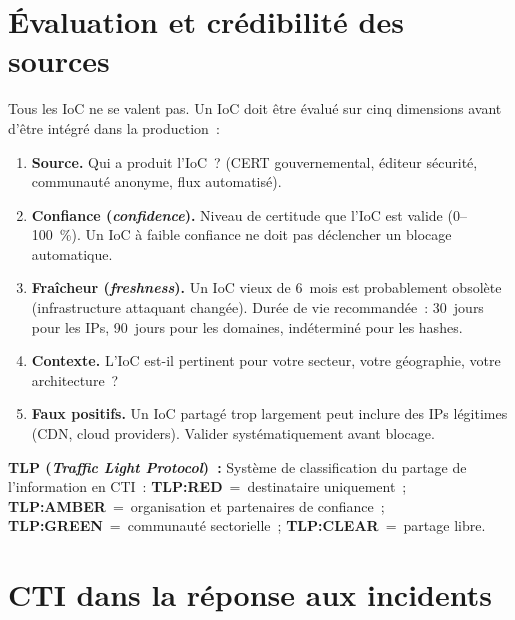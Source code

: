 \section{Évaluation et crédibilité des sources}
\label{sec:cti-credibilite}

Tous les IoC ne se valent pas. Un IoC doit être évalué sur cinq
dimensions avant d'être intégré dans la production~:

\begin{enumerate}
  \item \textbf{Source.} Qui a produit l'IoC~? (CERT gouvernemental,
        éditeur sécurité, communauté anonyme, flux automatisé).
  \item \textbf{Confiance (\textit{confidence}).} Niveau de certitude
        que l'IoC est valide (0--100~\%). Un IoC à faible confiance
        ne doit pas déclencher un blocage automatique.
  \item \textbf{Fraîcheur (\textit{freshness}).} Un IoC vieux de 6~mois
        est probablement obsolète (infrastructure attaquant changée).
        Durée de vie recommandée~: 30~jours pour les IPs,
        90~jours pour les domaines, indéterminé pour les hashes.
  \item \textbf{Contexte.} L'IoC est-il pertinent pour votre secteur,
        votre géographie, votre architecture~?
  \item \textbf{Faux positifs.} Un IoC partagé trop largement peut
        inclure des IPs légitimes (CDN, cloud providers). Valider
        systématiquement avant blocage.
\end{enumerate}

\begin{boxdef}
\textbf{TLP (\textit{Traffic Light Protocol})~:} Système de classification
du partage de l'information en CTI~:
\textbf{TLP:RED}~=~destinataire uniquement~;
\textbf{TLP:AMBER}~=~organisation et partenaires de confiance~;
\textbf{TLP:GREEN}~=~communauté sectorielle~;
\textbf{TLP:CLEAR}~=~partage libre.
\end{boxdef}

\section{CTI dans la réponse aux incidents}
\label{sec:cti-ir}

